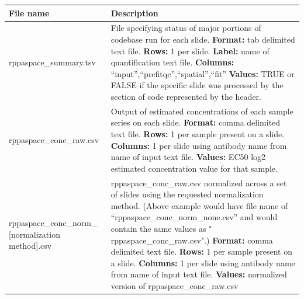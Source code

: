 \documentclass[
]{article}
\begin{document}
\begin{longtable}[]{@{}ll@{}}
\toprule
\begin{minipage}[b]{0.42\columnwidth}\raggedright
File name\strut
\end{minipage} & \begin{minipage}[b]{0.52\columnwidth}\raggedright
Description\strut
\end{minipage}\tabularnewline
\midrule
\endhead
\begin{minipage}[t]{0.42\columnwidth}\raggedright
rppaspace\_summary.tsv\strut
\end{minipage} & \begin{minipage}[t]{0.52\columnwidth}\raggedright
File specifying status of major portions of codebase run for each slide.
\textbf{Format:} tab delimited text file. \textbf{Rows:} 1 per slide.
\textbf{Label:} name of quantification text file. \textbf{Columns:}
``input'',``prefitqc'',``spatial'',``fit'' \textbf{Values:} TRUE or
FALSE if the specific slide was processed by the section of code
represented by the header.\strut
\end{minipage}\tabularnewline
\begin{minipage}[t]{0.42\columnwidth}\raggedright
rppaspace\_conc\_raw.csv\strut
\end{minipage} & \begin{minipage}[t]{0.52\columnwidth}\raggedright
Output of estimated concentrations of each sample series on each slide.
\textbf{Format:} comma delimited text file. \textbf{Rows:} 1 per sample
present on a slide. \textbf{Columns:} 1 per slide using antibody name
from name of input text file. \textbf{Values:} EC50 log2 estimated
concentration value for that sample.\strut
\end{minipage}\tabularnewline
\begin{minipage}[t]{0.42\columnwidth}\raggedright
rppaspace\_conc\_norm\_ {[}normalization method{]}.csv\strut
\end{minipage} & \begin{minipage}[t]{0.52\columnwidth}\raggedright
rppaspace\_conc\_raw.csv normalized across a set of slides using the
requested normalization method. (Above example would have file name of
``rppaspace\_conc\_norm\_none.csv'' and would contain the same values as
" rppaspace\_conc\_raw.csv".) \textbf{Format:} comma delimited text
file. \textbf{Rows:} 1 per sample present on a slide. \textbf{Columns:}
1 per slide using antibody name from name of input text file.
\textbf{Values:} normalized version of rppaspace\_conc\_raw.csv\strut
\end{minipage}\tabularnewline

\end{longtable}
\end{document}
